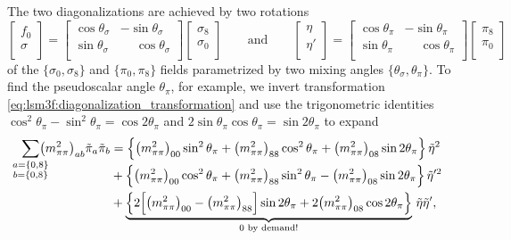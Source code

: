 The two diagonalizations are achieved by two rotations
\begin{equation}
	\begin{bmatrix} f_0 \\ \sigma \\ \end{bmatrix} = \begin{bmatrix} \cos \theta_\sigma & -\sin \theta_\sigma \\ \sin \theta_\sigma & \phantom{-} \cos \theta_\sigma \\ \end{bmatrix} \begin{bmatrix} \sigma_8 \\ \sigma_0 \\ \end{bmatrix}
	\qquad \text{and} \qquad
	\begin{bmatrix} \eta \\ \eta' \\ \end{bmatrix} = \begin{bmatrix} \cos \theta_\pi & -\sin \theta_\pi \\ \sin \theta_\pi & \phantom{-} \cos \theta_\pi \\ \end{bmatrix} \begin{bmatrix} \pi_8 \\ \pi_0 \\ \end{bmatrix}
	\label{eq:lsm3f:diagonalization_transformation}
\end{equation}
of the $\{\sigma_0, \sigma_8\}$ and $\{\pi_0, \pi_8\}$ fields parametrized by two mixing angles $\{\theta_\sigma, \theta_\pi\}$.
To find the pseudoscalar angle $\theta_\pi$, for example,
we invert transformation \eqref{eq:lsm3f:diagonalization_transformation} and use the trigonometric identities $\cos^2 \theta_\pi - \sin^2 \theta_\pi = \cos 2 \theta_\pi$ and $2 \sin\theta_\pi \cos\theta_\pi = \sin 2 \theta_\pi$ to expand
\begin{equation}
\begin{split}
	\smash{\smashoperator{\sum_{\substack{a=\{0,8\}\\b=\{0,8\}}}}} \big(m^2_{\pi\pi}\big)_{ab} \tilde{\pi}_a \tilde{\pi}_b &= \Big\{ \big(m^2_{\pi\pi}\big)_{00} \sin^2 \theta_\pi + \big(m^2_{\pi\pi}\big)_{88} \cos^2 \theta_\pi + \big(m^2_{\pi\pi}\big)_{08} \sin 2 \theta_\pi \Big\} \, \tilde{\eta}^2 \\
	                                                                                                                       &+ \Big\{ \big(m^2_{\pi\pi}\big)_{00} \cos^2 \theta_\pi + \big(m^2_{\pi\pi}\big)_{88} \sin^2 \theta_\pi - \big(m^2_{\pi\pi}\big)_{08} \sin 2 \theta_\pi \Big\} \, \tilde{\eta}'^2 \\
	                                                                                                                       &+ \underbrace{\Big\{ 2 \Big[ \big(m^2_{\pi\pi}\big)_{00} - \big(m^2_{\pi\pi}\big)_{88} \Big] \sin 2 \theta_\pi + 2 \big(m^2_{\pi\pi}\big)_{08} \cos 2 \theta_\pi \Big\}}_{\text{$0$ by demand!}} \, \tilde{\eta} \tilde{\eta}' ,
\end{split}
\label{eq:lsm3f:diagonalization_sum}
\end{equation}
